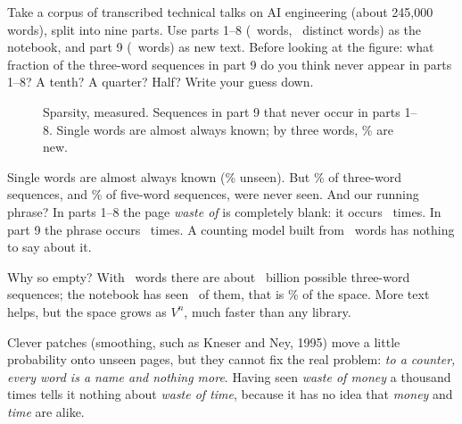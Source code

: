 \Predict Take a corpus of transcribed technical talks on AI engineering (about 245,000 words), split into nine
parts. Use parts 1--8 (\cTrainWords\ words, \cVocab\ distinct words) as the notebook, and part 9
(\cTestWords\ words) as new text. Before looking at the figure: what fraction of the three-word sequences in
part 9 do you think never appear in parts 1--8? A tenth? A
quarter? Half? Write your guess down.

\begin{figure}[h]
\centering
{}
\caption{Sparsity, measured. Sequences in part 9 that never occur in parts 1--8. Single words are
almost always known; by three words, \cUnseenThree\% are new.}
\end{figure}

Single words are almost always known (\cUnseenOne\% unseen). But \cUnseenThree\% of three-word sequences, and
\cUnseenFive\% of five-word sequences, were never seen. And our running phrase? In parts 1--8 the
page \emph{waste of} is completely blank: it occurs \cWasteOfTrain\ times. In part 9 the phrase
 occurs \cWasteOfTimeTest\ times. A counting model built from \cTrainWords\ words has nothing
to say about it.

\Sanity Why so empty? With \cVocab\ words there are about \cPossibleTriBillions\ billion possible three-word
sequences; the notebook has seen \cSeenTri\ of them, that is \cTriCoverage\% of the space. More text helps, but
the space grows as $V^n$, much faster than any library.

\Why Clever patches (smoothing, such as Kneser and Ney, 1995) move a little probability onto unseen pages, but
they cannot fix the real problem: \emph{to a counter, every word is a name and nothing more}. Having seen
\emph{waste of money} a thousand times tells it nothing about \emph{waste of time}, because it has no idea that
\emph{money} and \emph{time} are alike.

